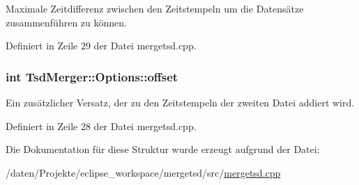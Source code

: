 Maximale Zeitdifferenz zwischen den Zeitstempeln um die Datensätze zusammenführen zu können. 



Definiert in Zeile 29 der Datei mergetsd.\-cpp.

\hypertarget{structTsdMerger_1_1Options_a01b3881ab882a6ec9690220bef2207b8}{
\subsubsection[{offset}]{\setlength{\rightskip}{0pt plus 5cm}int Tsd\-Merger\-::\-Options\-::offset}}\label{structTsdMerger_1_1Options_a01b3881ab882a6ec9690220bef2207b8}


Ein zusätzlicher Versatz, der zu den Zeitstempeln der zweiten Datei addiert wird. 



Definiert in Zeile 28 der Datei mergetsd.\-cpp.



Die Dokumentation für diese Struktur wurde erzeugt aufgrund der Datei\-:\begin{DoxyCompactItemize}
\item 
/daten/\-Projekte/eclipse\-\_\-workspace/mergetsd/src/\hyperlink{mergetsd_8cpp}{mergetsd.\-cpp}\end{DoxyCompactItemize}
